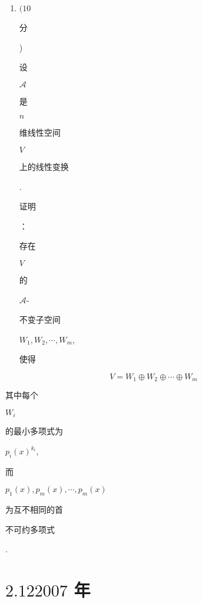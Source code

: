 \documentclass[10pt]{article}
\begin{document}
\begin{enumerate}
  \item $(10$ \begin{CJK}{UTF8}{mj}分\end{CJK}) \begin{CJK}{UTF8}{mj}设\end{CJK} $\mathscr{A}$ \begin{CJK}{UTF8}{mj}是\end{CJK} $n$ \begin{CJK}{UTF8}{mj}维线性空间\end{CJK} $V$ \begin{CJK}{UTF8}{mj}上的线性变换\end{CJK}. \begin{CJK}{UTF8}{mj}证明\end{CJK}：\begin{CJK}{UTF8}{mj}存在\end{CJK} $V$ \begin{CJK}{UTF8}{mj}的\end{CJK} $\mathscr{A}$-\begin{CJK}{UTF8}{mj}不变子空间\end{CJK} $W_{1}, W_{2}, \cdots, W_{m}$, \begin{CJK}{UTF8}{mj}使得\end{CJK}

\end{enumerate}
$$
V=W_{1} \oplus W_{2} \oplus \cdots \oplus W_{m}
$$
\begin{CJK}{UTF8}{mj}其中每个\end{CJK} $W_{i}$ \begin{CJK}{UTF8}{mj}的最小多项式为\end{CJK} $p_{i}(x)^{k_{i}}$, \begin{CJK}{UTF8}{mj}而\end{CJK} $p_{1}(x), p_{m}(x), \cdots, p_{m}(x)$ \begin{CJK}{UTF8}{mj}为互不相同的首\end{CJK} \begin{CJK}{UTF8}{mj}不可约多项式\end{CJK}.

\section{$2.122007$ 年}
\end{document}
